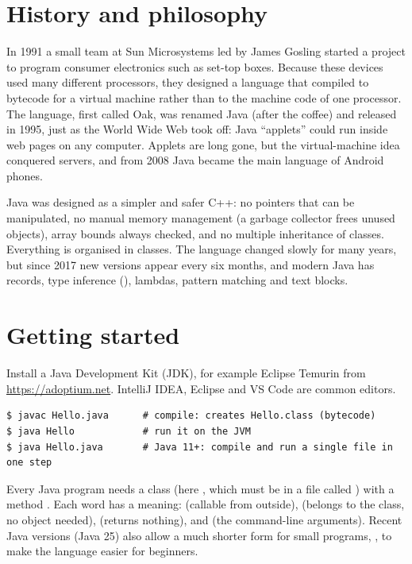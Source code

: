 \section{History and philosophy}

\begin{history}
In 1991 a small team at Sun Microsystems led by James Gosling started a project to
program consumer electronics such as set-top boxes. Because these devices used many
different processors, they designed a language that compiled to bytecode for a virtual
machine rather than to the machine code of one processor. The language, first called Oak,
was renamed Java (after the coffee) and released in 1995, just as the World Wide Web took
off: Java ``applets'' could run inside web pages on any computer. Applets are long gone,
but the virtual-machine idea conquered servers, and from 2008 Java became the main language
of Android phones.
\end{history}

Java was designed as a simpler and safer C++: no pointers that can be manipulated, no
manual memory management (a garbage collector frees unused objects), array bounds always
checked, and no multiple inheritance of classes. Everything is organised in classes. The
language changed slowly for many years, but since 2017 new versions appear every six
months, and modern Java has records, type inference (), lambdas, pattern
matching and text blocks.

\section{Getting started}

Install a Java Development Kit (JDK), for example Eclipse Temurin from
\url{https://adoptium.net}. IntelliJ IDEA, Eclipse and VS Code are common editors.
\begin{lstlisting}[style=shell]
$ javac Hello.java      # compile: creates Hello.class (bytecode)
$ java Hello            # run it on the JVM
$ java Hello.java       # Java 11+: compile and run a single file in one step
\end{lstlisting}
Every Java program needs a class (here , which must be in a file called
) with a method . Each word
has a meaning:  (callable from outside),  (belongs to the class,
no object needed),  (returns nothing), and  (the
command-line arguments). Recent Java versions (Java 25) also allow a much shorter form for
small programs, , to make the language easier
for beginners.

